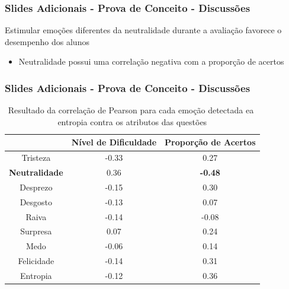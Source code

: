 \begin{frame}
\frametitle{Slides Adicionais - Prova de Conceito - Discussões}
\begin{block}{Estimular emo\c{c}\~oes diferentes da neutralidade durante a avalia\c{c}\~ao favorece o desempenho dos alunos}
\begin{itemize}
\pause
\item Neutralidade possui uma correla\c{c}\~ao negativa com a propor\c{c}\~ao de acertos
\end{itemize}
\end{block}

\end{frame}

\begin{frame}
\frametitle{Slides Adicionais - Prova de Conceito - Discussões}
\begin{table}[]\footnotesize
\centering
\caption{Resultado​ ​da​ ​correla\c{c}\~ao​ ​de​ ​Pearson​ ​para​ ​cada​ ​emo\c{c}\~ao​ ​detectada
e​ ​a​ ​entropia​ ​contra​ ​os​ ​atributos​ ​das​ ​quest\~oes}
\label{my-label}
\begin{tabular}{|c|c|c|}
\hline
                      & \textbf{Nível de Dificuldade} & \textbf{Proporção de Acertos} \\ \hline
Tristeza	     & -0.33                & 0.27                          \\ \hline
\small \textbf{Neutralidade} & 0.36                 & \small \textbf{-0.48}                \\ \hline
Desprezo     		& -0.15                         & 0.30                 \\ \hline
Desgosto              & -0.13                         & 0.07                          \\ \hline
Raiva                 & -0.14                         & -0.08                         \\ \hline
Surpresa              & 0.07                          & 0.24                          \\ \hline
Medo                  & -0.06                         & 0.14                          \\ \hline
Felicidade   		& -0.14                         & 0.31                 \\ \hline
Entropia     		& -0.12                         & 0.36                 \\ \hline
\end{tabular}
\end{table}
\end{frame}



